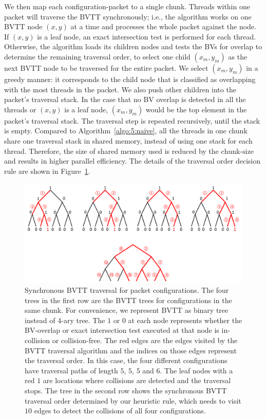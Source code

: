 We then map each configuration-packet to a single chunk. Threads within one packet will traverse the BVTT synchronously; i.e., the algorithm works on one BVTT node $(x, y)$ at a time and processes the whole packet against the node. If $(x,y)$ is a leaf node, an exact intersection test is performed for each thread. Otherwise, the algorithm loads its children nodes and tests the BVs for overlap to determine the remaining traversal order, to select one child $(x_m, y_m)$ as the next BVTT node to be traversed for the entire packet. We select $(x_m, y_m)$ in a greedy manner: it corresponds to the child node that is classified as overlapping with the most threads in the packet. We also push other children into the packet's traversal stack. In the case that no BV overlap is detected in all the
threads or $(x,y)$ is a leaf node, $(x_m, y_m)$ would be the top element in the packet's traversal stack.  The traversal
step is repeated recursively, until the stack is empty. Compared to Algorithm~\ref{algo:5:naive}, all the threads in one chunk share one
traversal stack in shared memory, instead of using one stack for each thread. Therefore, the size of shared memory used
is reduced by the $\text{chunk-size}$ and results in higher parallel efficiency. The details of the traversal order decision rule are shown in Figure~\ref{fig:5:packettraverse}.

\begin{figure}[htb]
  \centering
  \includegraphics[width=\linewidth]{figs/5/packettraverse.pdf}
  \caption[Synchronous BVTT traversal for packet configurations]{Synchronous BVTT traversal for packet configurations. The four trees in the first row are the BVTT trees for configurations in the same chunk. For convenience, we represent BVTT as binary tree instead of 4-ary tree. The $1$ or $0$ at each node represents whether the BV-overlap or exact intersection test executed at that node is in-collision or collision-free. The red edges are the edges visited by the BVTT traversal algorithm and the indices on those edges
  represent the traversal order. In this case, the four different configurations have traversal paths of length $5$, $5$, $5$ and $6$. The leaf nodes with a red $1$ are locations where collisions are detected and the traversal stops.
  The tree in the second row shows the synchronous BVTT traversal order determined by our heuristic rule, which needs to visit $10$ edges to detect the collisions of all four configurations.}
  \label{fig:5:packettraverse}
\end{figure}

